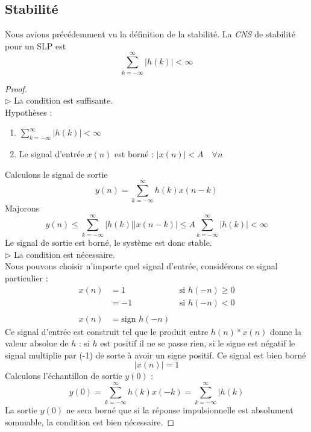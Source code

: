 	\subsection{Stabilité}
	Nous avions précédemment vu la définition de la stabilité. La \textit{CNS} de stabilité 
	pour un SLP est
	\begin{equation}
	\sum_{k=-\infty}^\infty |h(k)|<\infty
	\end{equation}
\newpage
	\begin{proof}\ \\
	$\triangleright$ La condition est suffisante.\\
	Hypothèses :
	\begin{enumerate}
	\item $\sum_{k=-\infty}^\infty |h(k)|<\infty$
	\item Le signal d'entrée $x(n)$ est borné : $|x(n)| < A\quad \forall n$
	\end{enumerate}	 
	Calculons le signal de sortie
	\begin{equation}
	y(n) = \sum_{k=-\infty}^\infty h(k)x(n-k)
	\end{equation}
	Majorons
	\begin{equation}
	y(n) \leq \sum_{k=-\infty}^\infty |h(k)||x(n-k)|\leq A\sum_{k=-\infty}^\infty|h(k)|<\infty
	\end{equation}
	Le signal de sortie est borné, le système est donc stable.\\
	
	$\triangleright$ La condition est nécessaire.\\
	Nous pouvons choisir n'importe quel signal d'entrée, considérons ce signal particulier :
	\begin{equation}
	\begin{array}{lll}
	x(n) &= 1 &\text{ si } h(-n) \geq 0\\
	&= -1 &\text{ si } h(-n) < 0\\
	& \\
	x(n) &= \text{sign }h(-n)
	\end{array}
	\end{equation}
	Ce signal d'entrée est construit tel que le produit entre $h(n)*x(n)$ donne la valeur 
	absolue de $h$ : si $h$ est positif il ne se passe rien, si le signe est négatif le 
	signal multiplie par (-1) de sorte à avoir un signe positif. Ce signal est bien borné
	\begin{equation}
	|x(n)| = 1
	\end{equation}
	Calculons l'échantillon de sortie $y(0)$ :
	\begin{equation}
	y(0) = \sum_{k=-\infty}^\infty h(k)x(-k) = \sum_{k=-\infty}^\infty |h(k)
	\end{equation}
	La sortie $y(0)$ ne sera borné que si la réponse impulsionnelle est absolument sommable, 
	la condition est bien nécessaire.	
	\end{proof}		
	
